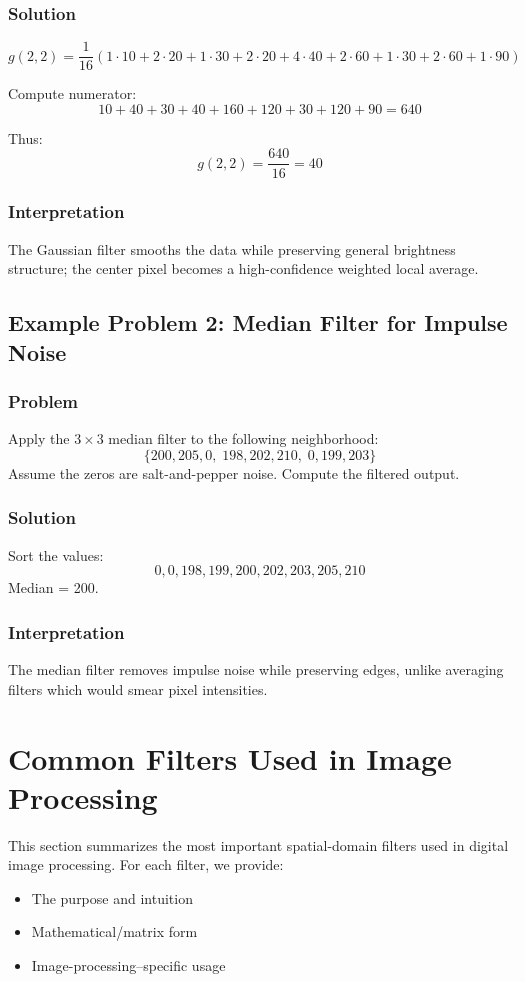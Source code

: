 \documentclass{AnantDocumentation}
\begin{document}
\subsubsection*{Solution}
\[
g(2,2) = \frac{1}{16} (1\cdot 10 + 2\cdot 20 + 1\cdot 30
+ 2\cdot 20 + 4\cdot 40 + 2\cdot 60
+ 1\cdot 30 + 2\cdot 60 + 1\cdot 90)
\]

Compute numerator:
\[
10 + 40 + 30 + 40 + 160 + 120 + 30 + 120 + 90 = 640
\]

Thus:
\[
g(2,2) = \frac{640}{16} = 40
\]

\subsubsection*{Interpretation}
The Gaussian filter smooths the data while preserving general brightness structure; the center pixel becomes a high-confidence weighted local average.

\subsection{Example Problem 2: Median Filter for Impulse Noise}

\subsubsection*{Problem}
Apply the $3 \times 3$ median filter to the following neighborhood:
\[
\{200, 205, 0,\; 198, 202, 210,\; 0, 199, 203\}
\]
Assume the zeros are salt-and-pepper noise. Compute the filtered output.

\subsubsection*{Solution}
Sort the values:
\[
0, 0, 198, 199, 200, 202, 203, 205, 210
\]
Median = 200.

\subsubsection*{Interpretation}
The median filter removes impulse noise while preserving edges, unlike averaging filters which would smear pixel intensities.
\section{Common Filters Used in Image Processing}

This section summarizes the most important spatial-domain filters used in digital image processing.  
For each filter, we provide:  
\begin{itemize}
\item The purpose and intuition  
\item Mathematical/matrix form  
\item Image-processing–specific usage  
\end{itemize}
\end{document}
